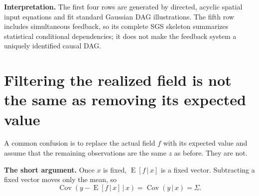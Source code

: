 \documentclass[11pt,a4paper]{article}
\newcommand{\Cov}{\operatorname{Cov}}
\newcommand{\E}{\operatorname{E}}
\newcommand{\given}{\,\vert\,}
\begin{document}
\textbf{Interpretation.} The first four rows are generated by directed, acyclic spatial input equations and fit standard Gaussian DAG illustrations. The fifth row includes simultaneous feedback, so its complete SGS skeleton summarizes statistical conditional dependencies; it does not make the feedback system a uniquely identified causal DAG.

\section{Filtering the realized field is not the same as removing its expected value}

A common confusion is to replace the actual field $f$ with its expected value and assume that the remaining observations are the same $z$ as before. They are not.

\textbf{The short argument.} Once $x$ is fixed, $\E[f\given x]$ is a fixed vector. Subtracting a fixed vector moves only the mean, so
\begin{equation}
\Cov(y-\E[f\given x]\given x)=\Cov(y\given x)=\Sigma.
\end{equation}
\end{document}
